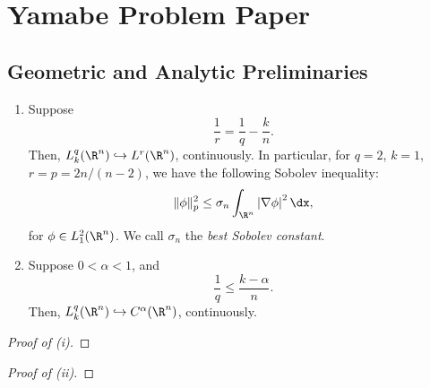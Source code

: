 \section{Yamabe Problem Paper}

\setcounter{subsection}{1}
\subsection{Geometric and Analytic Preliminaries}
\label{sub_sec:geometric_analytic_preliminaries}

\begin{theorem}\leavevmode
  \label{thm:sobolev_embedding_rn}

  \begin{enumerate}
    \item Suppose
      \[%
        \frac{1}{r} = \frac{1}{q} - \frac{k}{n}
      .\]%
      Then, $L^q_k(\R^n) \hookrightarrow L^r(\R^n)$, continuously. In particular, for $q = 2$, $k = 1$, $r = p = 2n/(n - 2)$, we have the following Sobolev inequality:
      \begin{equation}\label{eq:sobolev_inequality}
        \|\phi\|^2_p \le \sigma_n \int_{\R^n} \left\lvert \nabla \phi\right\rvert^2 \dx
      ,\end{equation}
      for $\phi \in L^2_1(\R^n)$. We call $\sigma_n$ the \emph{best Sobolev constant}.

    \item Suppose $0 < \alpha < 1$, and
      \[%
        \frac{1}{q} \le \frac{k - \alpha}{n}
      .\]%
      Then, $L^q_k(\R^n) \hookrightarrow C^\alpha(\R^n)$, continuously.
  \end{enumerate}
\end{theorem}

\begin{computational-work}\leavevmode
  \label{cw:sobolev_embedding_rn}
\end{computational-work}

\begin{proof}[Proof of (i)]
\end{proof}

\begin{proof}[Proof of (ii)]
\end{proof}

